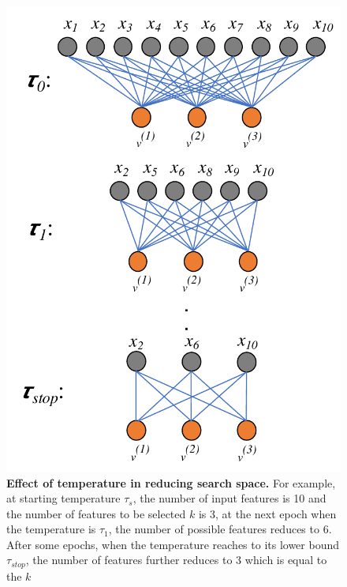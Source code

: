 \documentclass{bioinfo}
\begin{document}
\begin{figure}[h!]
    \centering
    \includegraphics[scale=0.5]{fig/temp-change.pdf}
    \caption{\textbf{Effect of temperature in reducing search space.} For example, at starting temperature $\tau_s$, the number of input features is 10 and the number of features to be selected $k$ is 3, at the next epoch when the temperature is $\tau_1$, the number of possible features reduces to 6. After some epochs, when the temperature reaches to its lower bound $\tau_{stop}$, the number of features further reduces to 3 which is equal to the $k$}
    \label{fig:temp-change}
\end{figure}
\end{document}

